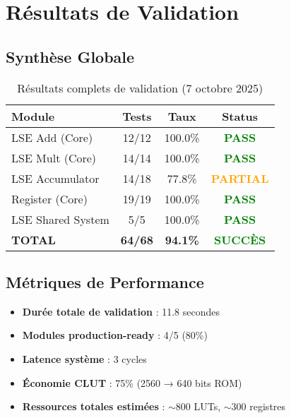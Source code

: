 \documentclass[12pt,a4paper]{article}
\begin{document}
\section{Résultats de Validation}

\subsection{Synthèse Globale}

\begin{table}[h]
\centering
\caption{Résultats complets de validation (7 octobre 2025)}
\begin{tabular}{|l|c|c|c|}
\hline
\textbf{Module} & \textbf{Tests} & \textbf{Taux} & \textbf{Status} \\
\hline
LSE Add (Core) & 12/12 & 100.0\% & \textcolor{green}{\textbf{PASS}} \\
LSE Mult (Core) & 14/14 & 100.0\% & \textcolor{green}{\textbf{PASS}} \\
LSE Accumulator & 14/18 & 77.8\% & \textcolor{orange}{\textbf{PARTIAL}} \\
Register (Core) & 19/19 & 100.0\% & \textcolor{green}{\textbf{PASS}} \\
LSE Shared System & 5/5 & 100.0\% & \textcolor{green}{\textbf{PASS}} \\
\hline
\textbf{TOTAL} & \textbf{64/68} & \textbf{94.1\%} & \textcolor{green}{\textbf{SUCCÈS}} \\
\hline
\end{tabular}
\end{table}

\subsection{Métriques de Performance}

\begin{itemize}
    \item \textbf{Durée totale de validation} : 11.8 secondes
    \item \textbf{Modules production-ready} : 4/5 (80\%)
    \item \textbf{Latence système} : 3 cycles
    \item \textbf{Économie CLUT} : 75\% (2560 → 640 bits ROM)
    \item \textbf{Ressources totales estimées} : $\sim$800 LUTs, $\sim$300 registres
\end{itemize}
\end{document}
